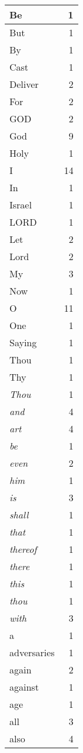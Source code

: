 \begin{center}
\begin{longtable}{l|r}
\hline \hline
\endlastfoot
Be & 1 \\ \hline
But & 1 \\ \hline
By & 1 \\ \hline
Cast & 1 \\ \hline
Deliver & 2 \\ \hline
For & 2 \\ \hline
GOD & 2 \\ \hline
God & 9 \\ \hline
Holy & 1 \\ \hline
I & 14 \\ \hline
In & 1 \\ \hline
Israel & 1 \\ \hline
LORD & 1 \\ \hline
Let & 2 \\ \hline
Lord & 2 \\ \hline
My & 3 \\ \hline
Now & 1 \\ \hline
O & 11 \\ \hline
One & 1 \\ \hline
Saying & 1 \\ \hline
Thou & 1 \\ \hline
Thy & 1 \\ \hline
\emph{Thou} & 1 \\ \hline
\emph{and} & 4 \\ \hline
\emph{art} & 4 \\ \hline
\emph{be} & 1 \\ \hline
\emph{even} & 2 \\ \hline
\emph{him} & 1 \\ \hline
\emph{is} & 3 \\ \hline
\emph{shall} & 1 \\ \hline
\emph{that} & 1 \\ \hline
\emph{thereof} & 1 \\ \hline
\emph{there} & 1 \\ \hline
\emph{this} & 1 \\ \hline
\emph{thou} & 1 \\ \hline
\emph{with} & 3 \\ \hline
a & 1 \\ \hline
adversaries & 1 \\ \hline
again & 2 \\ \hline
against & 1 \\ \hline
age & 1 \\ \hline
all & 3 \\ \hline
also & 4 \\ \hline

\end{longtable}
\end{center}
